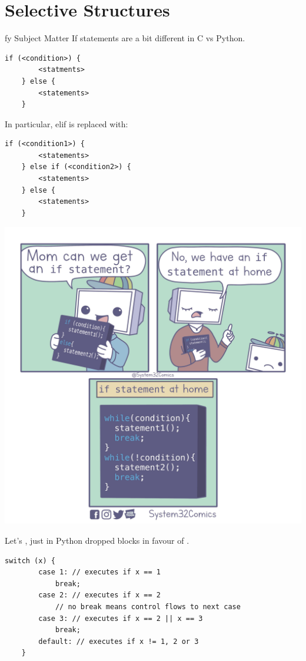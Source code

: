 \documentclass[11pt]{beamer}
\let\OldTexttt\texttt
\renewcommand{\texttt}[1]{\OldTexttt{\color{teal}{#1}}}
\begin{document}
\section[Branching]{Selective Structures}
\begin{frame}[fragile=singleslide]{\texttt{if}fy Subject Matter}
If statements are a bit different in C vs Python.
\begin{lstlisting}[style=C]
	if (<condition>) {
		<statments>
	} else {
		<statements>
	}
\end{lstlisting}
In particular, elif is replaced with:
\begin{lstlisting}[style=C]
	if (<condition1>) {
		<statements>
	} else if (<condition2>) {
		<statements>
	} else {
		<statements>
	}	
\end{lstlisting}
\end{frame}

\begin{frame}
\center
\includegraphics[scale=0.065]{ifstatement.jpg}
\end{frame}

\begin{frame}[fragile=singleslide]{Let's \texttt{switch}, just in \texttt{case}}
Python dropped \texttt{switch} blocks in favour of \texttt{elif}.
\begin{lstlisting}[style=C]
	switch (x) {
		case 1: // executes if x == 1
			break;
		case 2: // executes if x == 2
			// no break means control flows to next case
		case 3: // executes if x == 2 || x == 3
			break;
		default: // executes if x != 1, 2 or 3
	}	
\end{lstlisting}
\end{frame}
\end{document}
